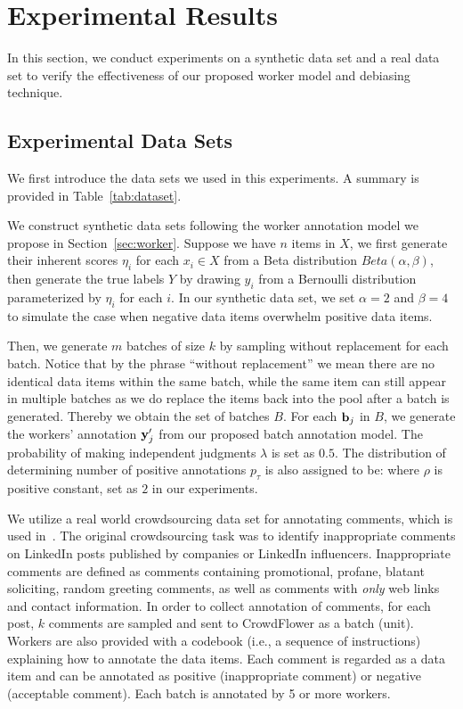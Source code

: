 
\section{Experimental Results}
\label{sec:exp}

In this section, we conduct experiments on a synthetic data set and a real data set 
to verify the effectiveness of our proposed worker model and debiasing technique.  

\subsection{Experimental Data Sets}
We first introduce the data sets we used in this experiments.  
A summary is provided in Table~\ref{tab:dataset}.  

We construct synthetic data sets following the worker annotation model we propose in Section~\ref{sec:worker}.
Suppose we have $n$ items in $X$, 
we first generate their inherent scores $\eta_i$ for each $x_i \in X$ 
from a Beta distribution $Beta(\alpha, \beta)$, 
then generate the true labels $Y$ by drawing $y_i$ from a Bernoulli distribution parameterized by $\eta_i$ for each $i$.  
In our synthetic data set, we set $\alpha = 2$ and $\beta = 4$ to simulate the case when negative data items overwhelm positive data items.

Then, we generate $m$ batches of size $k$ by sampling without replacement for each batch.  
Notice that by the phrase ``without replacement'' we mean there are no identical data items within the same batch, 
while the same item can still appear in multiple batches 
as we do replace the items back into the pool after a batch is generated.  
Thereby we obtain the set of batches $B$.  
For each ${\mathbf{b}}_j$ in $B$, we generate the workers' annotation ${\mathbf{y}}_j'$ from our proposed batch annotation model.  
The probability of making independent judgments $\lambda$ is set as $0.5$.
The distribution of determining number of positive annotations $p_{\tau}$ is also assigned to be:
%
where $\rho$ is positive constant, set as $2$ in our experiments.  

We utilize a real world crowdsourcing data set for annotating comments, which is used in~\cite{zhuang:wsdm2015}.
The original crowdsourcing task was to identify inappropriate comments on LinkedIn posts published by companies or LinkedIn influencers.  
Inappropriate comments are defined as comments containing promotional, profane, blatant soliciting, random greeting comments, 
as well as comments with \emph{only} web links and contact information.  
In order to collect annotation of comments, 
for each post, $k$ comments are sampled and sent to CrowdFlower as a batch (unit).  
Workers are also provided with a codebook (i.e., a sequence of instructions) 
explaining how to annotate the data items.  
Each comment is regarded as a data item 
and can be annotated as positive (inappropriate comment) or negative (acceptable comment).  
Each batch is annotated by 5 or more workers.  

